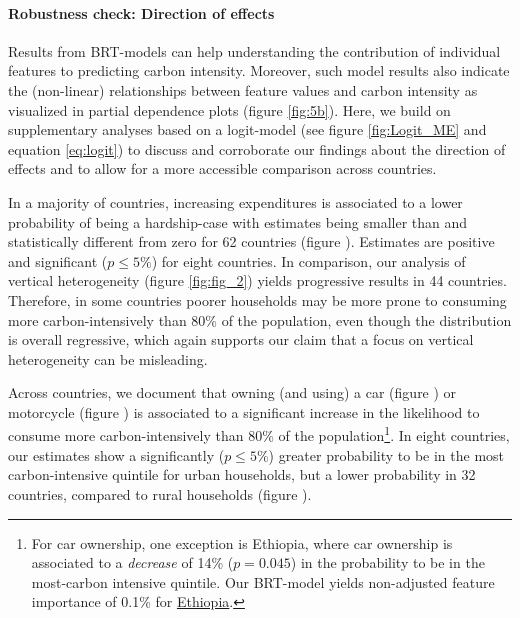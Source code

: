 \documentclass[12pt, a4paper]{article}
\begin{document}
\paragraph{Robustness check: Direction of effects}
Results from BRT-models can help understanding the contribution of individual features to predicting carbon intensity. Moreover, such model results also indicate the (non-linear) relationships between feature values and carbon intensity as visualized in partial dependence plots (figure \ref{fig:5b}). Here, we build on supplementary analyses based on a logit-model (see figure \ref{fig:Logit_ME} and equation \ref{eq:logit}) to discuss and corroborate our findings about the direction of effects and to allow for a more accessible comparison across countries.

In a majority of countries, increasing expenditures is associated to a lower probability of being a hardship-case with estimates being smaller than and statistically different from zero for 62 countries (figure ). Estimates are positive and significant ($p\leq 5\%$) for eight countries. In comparison, our analysis of vertical heterogeneity (figure \ref{fig:fig_2}) yields progressive results in 44 countries. Therefore, in some countries poorer households may be more prone to consuming more carbon-intensively than 80\% of the population, even though the distribution is overall regressive, which again supports our claim that a focus on vertical heterogeneity can be misleading.

Across countries, we document that owning (and using) a car (figure ) or motorcycle (figure ) is associated to a significant increase in the likelihood to consume more carbon-intensively than 80\% of the population\footnote{For car ownership, one exception is Ethiopia, where car ownership is associated to a \textit{decrease} of 14\% ($p=0.045$) in the probability to be in the most-carbon intensive quintile. Our BRT-model yields non-adjusted feature importance of 0.1\% for \hyperref[fig:5b_ETH]{Ethiopia}.}. In eight countries, our estimates show a significantly ($p\leq 5\%$) greater probability to be in the most carbon-intensive quintile for urban households, but a lower probability in 32 countries, compared to rural households (figure ).
\end{document}
